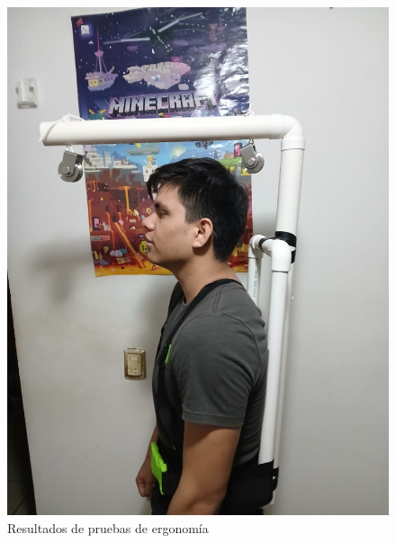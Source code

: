 \begin{figure}[H]
    \centering
    \includegraphics[width=1\textwidth, height=.9\textheight]{img/PruebaErgonomica3.png}
    \caption{Resultados de pruebas de ergonomía}
    \label{fig:ergo-test}
\end{figure}

